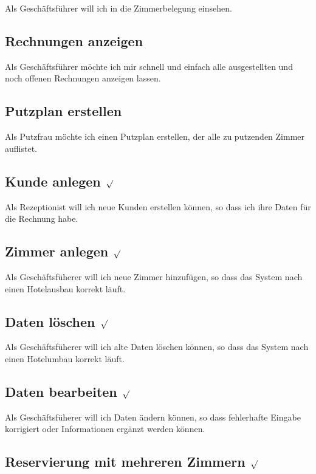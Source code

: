 \documentclass[11pt]{scrartcl}
\begin{document}
Als Geschäftsführer will ich in die Zimmerbelegung einsehen.

\subsection{Rechnungen anzeigen}

Als Geschäftsführer möchte ich mir schnell und einfach alle ausgestellten und noch offenen Rechnungen anzeigen lassen.

\subsection{Putzplan erstellen}

Als Putzfrau möchte ich einen Putzplan erstellen, der alle zu putzenden Zimmer auflistet.

\subsection{Kunde anlegen $\surd$}

Als Rezeptionist will ich neue Kunden erstellen können, so dass ich ihre Daten für die Rechnung habe.

\subsection{Zimmer anlegen $\surd$}

Als Geschäftsfüherer will ich neue Zimmer hinzufügen, so dass das System nach einen Hotelausbau korrekt läuft.

\subsection{Daten löschen $\surd$}

Als Geschäftsfüherer will ich alte Daten löschen können, so dass das System nach einen Hotelumbau korrekt läuft.

\subsection{Daten bearbeiten $\surd$}

Als Geschäftsfüherer will ich Daten ändern können, so dass fehlerhafte Eingabe korrigiert oder Informationen ergänzt werden können.

\subsection{Reservierung mit mehreren Zimmern $\surd$}
\end{document}
